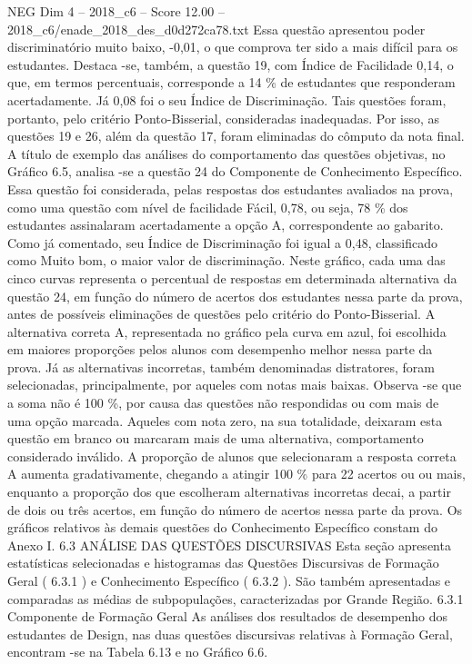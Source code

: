 \begin{textsample}{NEG Dim 4 – 2018\_c6 – Score 12.00 – 2018\_c6/enade\_2018\_des\_d0d272ca78.txt}
Essa questão apresentou poder discriminatório muito baixo, -0,01, o que comprova ter sido a mais difícil para os estudantes.
Destaca -se, também, a questão 19, com Índice de Facilidade 0,14, o que, em termos percentuais, corresponde a 14 \% de estudantes que responderam acertadamente.
Já 0,08 foi o seu Índice de Discriminação.
Tais questões foram, portanto, pelo critério Ponto-Bisserial, consideradas inadequadas.
Por isso, as questões 19 e 26, além da questão 17, foram eliminadas do cômputo da nota final.
A título de exemplo das análises do comportamento das questões objetivas, no Gráfico 6.5, analisa -se a questão 24 do Componente de Conhecimento Específico.
Essa questão foi considerada, pelas respostas dos estudantes avaliados na prova, como uma questão com nível de facilidade Fácil, 0,78, ou seja, 78 \% dos estudantes assinalaram acertadamente a opção A, correspondente ao gabarito.
Como já comentado, seu Índice de Discriminação foi igual a 0,48, classificado como Muito bom, o maior valor de discriminação.
Neste gráfico, cada uma das cinco curvas representa o percentual de respostas em determinada alternativa da questão 24, em função do número de acertos dos estudantes nessa parte da prova, antes de possíveis eliminações de questões pelo critério do Ponto-Bisserial.
A alternativa correta A, representada no gráfico pela curva em azul, foi escolhida em maiores proporções pelos alunos com desempenho melhor nessa parte da prova.
Já as alternativas incorretas, também denominadas distratores, foram selecionadas, principalmente, por aqueles com notas mais baixas.
Observa -se que a soma não é 100 \%, por causa das questões não respondidas ou com mais de uma opção marcada.
Aqueles com nota zero, na sua totalidade, deixaram esta questão em branco ou marcaram mais de uma alternativa, comportamento considerado inválido.
A proporção de alunos que selecionaram a resposta correta A aumenta gradativamente, chegando a atingir 100 \% para 22 acertos ou ou mais, enquanto a proporção dos que escolheram alternativas incorretas decai, a partir de dois ou três acertos, em função do número de acertos nessa parte da prova.
Os gráficos relativos às demais questões do Conhecimento Específico constam do Anexo I. 6.3 ANÁLISE DAS QUESTÕES DISCURSIVAS Esta seção apresenta estatísticas selecionadas e histogramas das Questões Discursivas de Formação Geral ( 6.3.1 ) e Conhecimento Específico ( 6.3.2 ).
São também apresentadas e comparadas as médias de subpopulações, caracterizadas por Grande Região. 6.3.1 Componente de Formação Geral As análises dos resultados de desempenho dos estudantes de Design, nas duas questões discursivas relativas à Formação Geral, encontram -se na Tabela 6.13 e no Gráfico 6.6.

\end{textsample}
